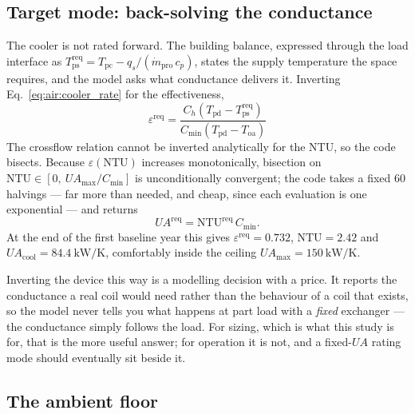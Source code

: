 \documentclass[11pt]{article}
\newcommand{\mdp}{\ensuremath{\dot m_{\mathrm{pro}}}}
\newcommand{\UA}{\ensuremath{U\!A}}
\newcommand{\qs}{\ensuremath{q_{s}}}
\begin{document}
\subsection{Target mode: back-solving the conductance}
\label{sec:air:target}

The cooler is not rated forward. The building balance, expressed through the
load interface as $T_{\mathrm{ps}}^{\mathrm{req}} = T_{\mathrm{pc}} -
\qs/(\mdp\,c_{p})$, states the supply temperature the space requires, and the
model asks what conductance delivers it. Inverting
Eq.~\eqref{eq:air:cooler_rate} for the effectiveness,
\begin{equation}
\boxed{\;
\varepsilon^{\mathrm{req}} =
\frac{C_h\left(T_{\mathrm{pd}}-T_{\mathrm{ps}}^{\mathrm{req}}\right)}
     {C_{\min}\left(T_{\mathrm{pd}}-T_{\mathrm{oa}}\right)}
\;}
\label{eq:air:eps_req}
\end{equation}
The crossflow relation cannot be inverted analytically for the NTU, so the code
bisects. Because $\varepsilon(\mathrm{NTU})$ increases monotonically, bisection
on $\mathrm{NTU}\in[0,\ \UA_{\max}/C_{\min}]$ is unconditionally convergent;
the code takes a fixed \num{60} halvings --- far more than needed, and cheap,
since each evaluation is one exponential --- and returns
\begin{equation}
\UA^{\mathrm{req}} = \mathrm{NTU}^{\mathrm{req}}\,C_{\min} .
\label{eq:air:UAreq}
\end{equation}
At the end of the first baseline year this gives
$\varepsilon^{\mathrm{req}}=\num{0.732}$, $\mathrm{NTU}=\num{2.42}$ and
$\UA_{\mathrm{cool}}=\SI{84.4}{\kilo\watt\per\kelvin}$, comfortably inside the
ceiling $\UA_{\max}=\SI{150}{\kilo\watt\per\kelvin}$.

Inverting the device this way is a modelling decision with a price. It reports
the conductance a real coil would need rather than the behaviour of a coil that
exists, so the model never tells you what happens at part load with a
\emph{fixed} exchanger --- the conductance simply follows the load. For sizing,
which is what this study is for, that is the more useful answer; for operation
it is not, and a fixed-$\UA$ rating mode should eventually sit beside it.

\subsection{The ambient floor}
\label{sec:air:floor}
\end{document}
